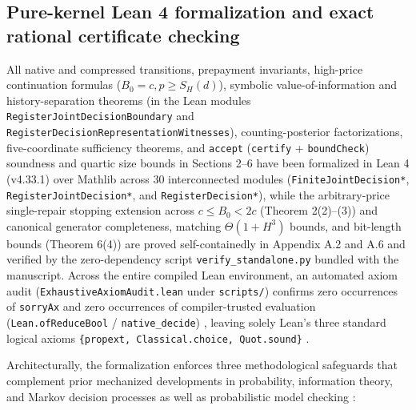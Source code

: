 \documentclass[11pt,a4paper]{article}
\begin{document}
\subsection{Pure-kernel Lean 4 formalization and exact rational
certificate
checking}\label{pure-kernel-lean-4-formalization-and-exact-rational-certificate-checking}

All native and compressed transitions, prepayment invariants, high-price
continuation formulas (\(B_0 = c, p \ge S_H(d)\)), symbolic
value-of-information and history-separation theorems (in the Lean
modules \texttt{RegisterJointDecisionBoundary} and
\texttt{RegisterDecisionRepresentationWitnesses}), counting-posterior
factorizations, five-coordinate sufficiency theorems, and
\texttt{accept} (\texttt{certify} + \texttt{boundCheck}) soundness and
quartic size bounds in Sections 2--6 have been formalized in Lean 4
(v4.33.1) over Mathlib \citep{mouraUllrich2021, mathlib2020} across 30
interconnected modules (\texttt{FiniteJointDecision*},
\texttt{RegisterJointDecision*}, and \texttt{RegisterDecision*}), while
the arbitrary-price single-repair stopping extension across
\(c \le B_0 < 2c\) (Theorem 2(2)--(3)) and canonical generator
completeness, matching \(\Theta(1 + H^3)\) bounds, and bit-length bounds
(Theorem 6(4)) are proved self-containedly in Appendix A.2 and A.6 and
verified by the zero-dependency script \texttt{verify\_standalone.py}
bundled with the manuscript. Across the entire compiled Lean
environment, an automated axiom audit
(\texttt{ExhaustiveAxiomAudit.lean} under \texttt{scripts/}) confirms
zero occurrences of \texttt{sorryAx} and zero occurrences of
compiler-trusted evaluation (\texttt{Lean.ofReduceBool} /
\texttt{native\_decide}) \citep{boespflug2011}, leaving solely Lean's
three standard logical axioms
\texttt{\{propext,\ Classical.choice,\ Quot.sound\}}
\citep{carneiro2019}.

Architecturally, the formalization enforces three methodological
safeguards that complement prior mechanized developments in probability,
information theory, and Markov decision processes
\citep{nipkowPaulsonWenzel2002, bertotCasteran2004, affeldt2014, eberl2015, hoelzl2017, vajjha2021, schaeffelerAbdulaziz2023}
as well as probabilistic model checking
\citep{baierKatoen2008, kwiatkowska2011}:
\end{document}
